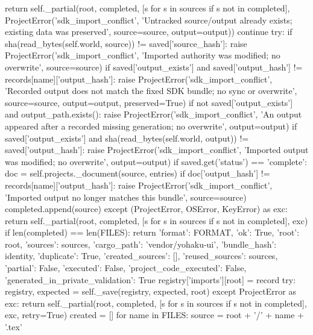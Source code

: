                     return self._partial(root, completed, [s for s in sources if s not in completed],
                                         ProjectError('sdk_import_conflict', 'Untracked source/output already exists; existing data was preserved', source=source, output=output))
                continue
            try:
                if sha(read_bytes(self.world, source)) != saved['source_hash']:
                    raise ProjectError('sdk_import_conflict', 'Imported authority was modified; no overwrite', source=source)
                if saved['output_exists'] and saved['output_hash'] != records[name]['output_hash']:
                    raise ProjectError('sdk_import_conflict', 'Recorded output does not match the fixed SDK bundle; no sync or overwrite',
                                       source=source, output=output, preserved=True)
                if not saved['output_exists'] and output_path.exists():
                    raise ProjectError('sdk_import_conflict', 'An output appeared after a recorded missing generation; no overwrite', output=output)
                if saved['output_exists'] and sha(read_bytes(self.world, output)) != saved['output_hash']:
                    raise ProjectError('sdk_import_conflict', 'Imported output was modified; no overwrite', output=output)
                if saved.get('status') == 'complete':
                    doc = self.projects._document(source, entries)
                    if doc['output_hash'] != records[name]['output_hash']:
                        raise ProjectError('sdk_import_conflict', 'Imported output no longer matches this bundle', source=source)
                    completed.append(source)
            except (ProjectError, OSError, KeyError) as exc:
                return self._partial(root, completed, [s for s in sources if s not in completed], exc)
        if len(completed) == len(FILES):
            return {'format': FORMAT, 'ok': True, 'root': root, 'sources': sources,
                    'cargo_path': 'vendor/yohaku-ui', 'bundle_hash': identity, 'duplicate': True,
                    'created_sources': [], 'reused_sources': sources, 'partial': False,
                    'executed': False, 'project_code_executed': False, 'generated_in_private_validation': True}
        registry['imports'][root] = record
        try:
            registry, expected = self._save(registry, expected, root)
        except ProjectError as exc:
            return self._partial(root, completed, [s for s in sources if s not in completed], exc, retry=True)
        created = []
        for name in FILES:
            source = root + '/' + name + '.tex'
